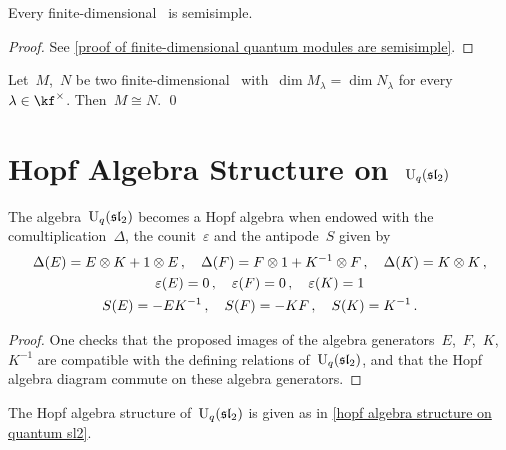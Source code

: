 \documentclass[a4paper, 11pt, oneside]{scrartcl}
\begin{document}
\begin{theorem}
  \label{finite-dimensional quantum modules are semisimple}
  Every finite-dimensional~ is semisimple.
\end{theorem}

\begin{proof}[Proof]
  See \cref{proof of finite-dimensional quantum modules are semisimple}.
\end{proof}
  
\begin{corollary}
  \label{decomposition from quantum weight spaces}
  Let~$M$,~$N$ be two finite-dimensional~ with~$\dim M_\lambda = \dim N_\lambda$ for every~$\lambda \in \kf^\times$.
  Then~$M \cong N$.
  \qed
\end{corollary}





\section{Hopf Algebra Structure on~$\operatorname{U}_q(\mathfrak{sl}_2)$}


\begin{proposition}
  \label{hopf algebra structure on quantum sl2}
  The algebra~$\operatorname{U}_q(\mathfrak{sl}_2)$ becomes a Hopf algebra when endowed with the comultiplication~$\Delta$, the counit~$\varepsilon$ and the antipode~$S$ given by
  \begin{gather*}
    \Delta(E) = E \otimes K + 1 \otimes E \,,
    \quad
    \Delta(F) = F \otimes 1 + K^{-1} \otimes F \,,
    \quad
    \Delta(K) = K \otimes K \,,
    \\
    \varepsilon(E) = 0 \,,
    \quad
    \varepsilon(F) = 0 \,,
    \quad
    \varepsilon(K) = 1
    \\
    S(E) = -E K^{-1} \,,
    \quad
    S(F) = -KF \,,
    \quad
    S(K) = K^{-1} \,.
  \end{gather*}
\end{proposition}

\begin{proof}
  One checks that the proposed images of the algebra generators~$E$,~$F$,~$K$,~$K^{-1}$ are compatible with the defining relations of~$\operatorname{U}_q(\mathfrak{sl}_2)$, and that the Hopf algebra diagram commute on these algebra generators.
\end{proof}

\begin{definition}
  The Hopf algebra structure of~$\operatorname{U}_q(\mathfrak{sl}_2)$ is given as in \cref{hopf algebra structure on quantum sl2}.
\end{definition}
\end{document}
